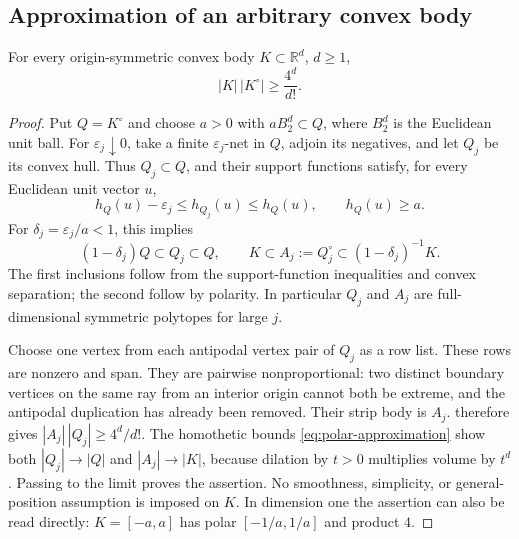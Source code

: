 \subsection{Approximation of an arbitrary convex body}

\begin{corollary}
\label{cor:symmetric-inequality}
For every origin-symmetric convex body $K\subset\mathbb{R}^d$, $d\geq1$,
\[
 |K|\,|K^\circ|\geq\frac{4^d}{d!}.
\]
\end{corollary}

\begin{proof}
Put $Q=K^\circ$ and choose $a>0$ with $aB_2^d\subset Q$, where $B_2^d$ is the Euclidean unit ball. For $\varepsilon_j\downarrow0$, take a finite $\varepsilon_j$-net in $Q$, adjoin its negatives, and let $Q_j$ be its convex hull. Thus $Q_j\subset Q$, and their support functions satisfy, for every Euclidean unit vector $u$,
\[
 h_Q(u)-\varepsilon_j\leq h_{Q_j}(u)\leq h_Q(u),
 \qquad h_Q(u)\geq a.
\]
For $\delta_j=\varepsilon_j/a<1$, this implies
\begin{equation}\label{eq:polar-approximation}
 (1-\delta_j)Q\subset Q_j\subset Q,
 \qquad
 K\subset A_j:=Q_j^\circ\subset(1-\delta_j)^{-1}K.
\end{equation}
The first inclusions follow from the support-function inequalities and convex separation; the second follow by polarity. In particular $Q_j$ and $A_j$ are full-dimensional symmetric polytopes for large $j$.

Choose one vertex from each antipodal vertex pair of $Q_j$ as a row list. These rows are nonzero and span. They are pairwise nonproportional: two distinct boundary vertices on the same ray from an interior origin cannot both be extreme, and the antipodal duplication has already been removed. Their strip body is $A_j$.  therefore gives $|A_j|\,|Q_j|\geq4^d/d!$. The homothetic bounds \eqref{eq:polar-approximation} show both $|Q_j|\to|Q|$ and $|A_j|\to|K|$, because dilation by $t>0$ multiplies volume by $t^d$. Passing to the limit proves the assertion. No smoothness, simplicity, or general-position assumption is imposed on $K$. In dimension one the assertion can also be read directly: $K=[-a,a]$ has polar $[-1/a,1/a]$ and product $4$.
\end{proof}
